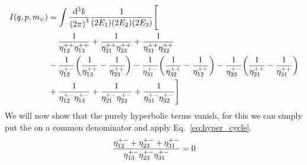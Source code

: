 \begin{align*}
I(q,p,m_\psi)
&=  \int \frac{\dd[3]{k}}{{(2\pi)}^3} \frac{1}{(2E_1)(2E_2)(2E_3)} \Bigg[\\
&\phantom{{}+{}}
  \frac{1}{\ELIPT{1}{2}\ELIPT{1}{3}}
+ \frac{1}{\ELIPT{2}{1}\ELIPT{2}{3}}
+ \frac{1}{\ELIPT{3}{1}\ELIPT{3}{2}}\\
&
-\frac{1}{\HYPER{1}{2}}\qty(\frac{1}{\ELIPT{1}{3}} - \frac{1}{\ELIPT{2}{3}})
-\frac{1}{\HYPER{3}{1}}\qty(\frac{1}{\ELIPT{3}{2}} - \frac{1}{\ELIPT{1}{2}})
-\frac{1}{\HYPER{2}{3}}\qty(\frac{1}{\ELIPT{2}{1}} - \frac{1}{\ELIPT{3}{1}})\\
&
+ \frac{1}{\HYPER{1}{2}\HYPER{1}{3}}
+ \frac{1}{\HYPER{2}{1}\HYPER{2}{3}}
+ \frac{1}{\HYPER{3}{1}\HYPER{3}{2}}
\Bigg]
\end{align*}
We will now show that the purely hyperbolic terms vanish,
for this we can simply put the on a common denominator and apply Eq.~\eqref{eq:hyper_cycle}.
\begin{equation}
    \frac{\eta_{12}^{+-}+\eta_{23}^{+-}+\eta_{31}^{+-}}{\eta_{13}^{+-}\eta_{23}^{+-}\eta_{31}^{+-}} = 0
\end{equation}
